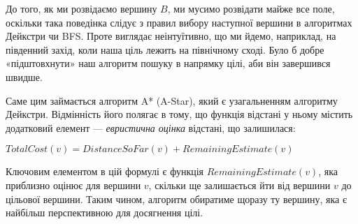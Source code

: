 \documentclass[12pt,a4paper]{report}
\begin{document}
\begin{center}
\end{center}

До того, як ми розвідаємо вершину \(B\), ми мусимо розвідати майже все поле, оскільки така поведінка слідує з правил вибору наступної вершини в алгоритмах Дейкстри чи BFS.
Проте виглядає неінтуїтивно, що ми йдемо, наприклад, на південний захід, коли наша ціль лежить на північному сході. Було б добре «підштовхнути» наш алгоритм пошуку в напрямку цілі, аби він завершився швидше.

Саме цим займається алгоритм A* (A-Star), який є узагальненням алгоритму Дейкстри. Відмінність його полягає в тому, що функція відстані у ньому містить додатковий елемент --- \emph{евристична оцінка} відстані, що залишилася:

\(TotalCost(v) = DistanceSoFar(v) + RemainingEstimate(v)\)

Ключовим елементом в цій формулі є функція \(RemainingEstimate(v)\), яка приблизно оцінює для вершини \(v\), скільки ще залишається йти від вершини \(v\) до цільової вершини. Таким чином, алгоритм обиратиме щоразу ту вершину, яка є найбільш перспективною для досягнення цілі.
\end{document}
